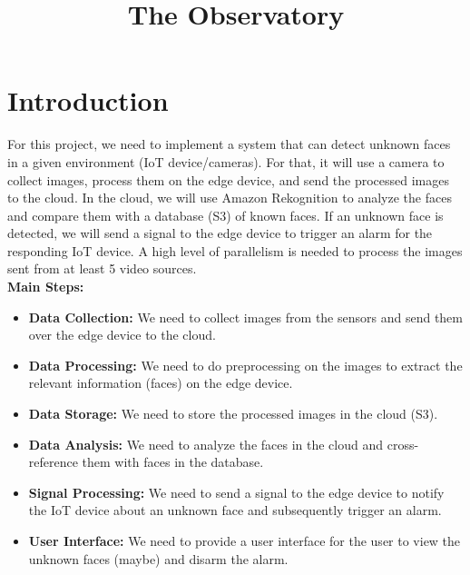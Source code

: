 \documentclass[conference]{IEEEtran}
\begin{document}
\title{The Observatory}

\author{
    \and
    \and
}

\maketitle

\section{Introduction}
For this project, we need to implement a system that can detect unknown faces in a given environment (IoT device/cameras).
For that, it will use a camera to collect images, process them on the edge device, and send the processed images to the cloud.
In the cloud, we will use Amazon Rekognition to analyze the faces and compare them with a database (S3) of known faces.
If an unknown face is detected, we will send a signal to the edge device to trigger an alarm for the responding IoT device.
A high level of parallelism is needed to process the images sent from at least 5 video sources.
\\
\textbf{Main Steps:}
\begin{itemize}
    \item \textbf{Data Collection:} We need to collect images from the sensors and send them over the edge device to the cloud.
    \item \textbf{Data Processing:} We need to do preprocessing on the images to extract the relevant information (faces) on the edge device.
    \item \textbf{Data Storage:} We need to store the processed images in the cloud (S3).
    \item \textbf{Data Analysis:} We need to analyze the faces in the cloud and cross-reference them with faces in the database.
    \item \textbf{Signal Processing:} We need to send a signal to the edge device to notify the IoT device about an unknown face and subsequently trigger an alarm.
    \item \textbf{User Interface:} We need to provide a user interface for the user to view the unknown faces (maybe) and disarm the alarm.
\end{itemize}
\end{document}
